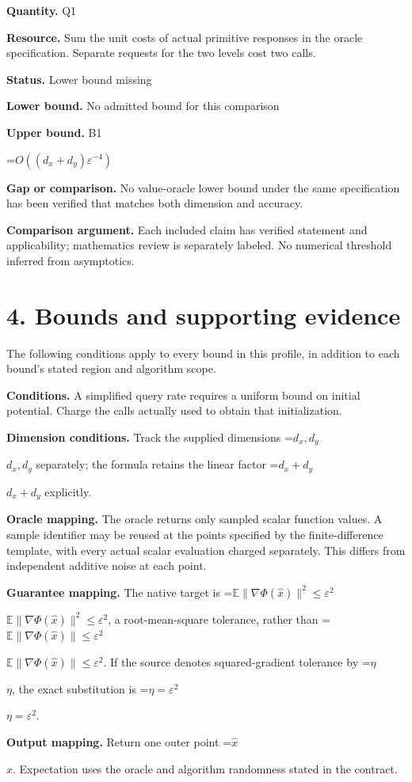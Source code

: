 \documentclass[10pt,a4paper]{article}
\newcommand{\AtlasMath}[1]{\par\begingroup\centering\setbox0=\hbox{$\displaystyle #1$}\ifdim\wd0>1.4\linewidth\typeout{ATLAS WIDE FORMULA: \the\wd0}\fi\ifdim\wd0>\linewidth\resizebox{\linewidth}{!}{\box0}\else\box0\fi\par\endgroup}
\newcommand{\AtlasInlineMath}[1]{\begingroup\setbox0=\hbox{$#1$}\ifdim\wd0>.4\linewidth\endgroup\AtlasMath{#1}\else\endgroup$#1$\fi}
\begin{document}
\textbf{Quantity.} Q1

\textbf{Resource.} Sum the unit costs of actual primitive responses in the oracle specification. Separate requests for the two levels cost two calls.

\textbf{Status.} Lower bound missing

\textbf{Lower bound.} No admitted bound for this comparison

\textbf{Upper bound.} B1

\AtlasMath{O((d_x+d_y) \varepsilon ^{-4})}
\textbf{Gap or comparison.} No value-oracle lower bound under the same specification has been verified that matches both dimension and accuracy.

\textbf{Comparison argument.} Each included claim has verified statement and applicability; mathematics review is separately labeled. No numerical threshold inferred from asymptotics.

\section{4. Bounds and supporting evidence}
The following conditions apply to every bound in this profile, in addition to each bound's stated region and algorithm scope.

\textbf{Conditions.} A simplified query rate requires a uniform bound on initial potential. Charge the calls actually used to obtain that initialization.

\textbf{Dimension conditions.} Track the supplied dimensions \AtlasInlineMath{d_x,d_y} separately; the formula retains the linear factor \AtlasInlineMath{d_x+d_y} explicitly.

\textbf{Oracle mapping.} The oracle returns only sampled scalar function values. A sample identifier may be reused at the points specified by the finite-difference template, with every actual scalar evaluation charged separately. This differs from independent additive noise at each point.

\textbf{Guarantee mapping.} The native target is \AtlasInlineMath{\mathbb E\|\nabla\Phi(\widehat x)\|^2\le\varepsilon^2}, a root-mean-square tolerance, rather than \AtlasInlineMath{\mathbb E\|\nabla\Phi(\widehat x)\|\le\varepsilon^2}. If the source denotes squared-gradient tolerance by \AtlasInlineMath{\eta}, the exact substitution is \AtlasInlineMath{\eta=\varepsilon^2}.

\textbf{Output mapping.} Return one outer point \AtlasInlineMath{\widehat x}. Expectation uses the oracle and algorithm randomness stated in the contract.
\end{document}
